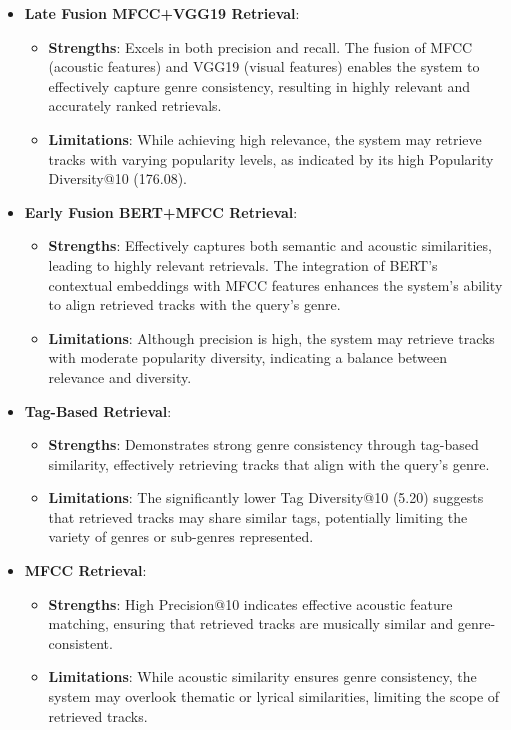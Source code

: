 \documentclass[sigconf]{acmart}
\begin{document}
\begin{itemize}
    \item \textbf{Late Fusion MFCC+VGG19 Retrieval}:
    \begin{itemize}
        \item \textbf{Strengths}: Excels in both precision and recall. The fusion of MFCC (acoustic features) and VGG19 (visual features) enables the system to effectively capture genre consistency, resulting in highly relevant and accurately ranked retrievals.
        \item \textbf{Limitations}: While achieving high relevance, the system may retrieve tracks with varying popularity levels, as indicated by its high Popularity Diversity@10 (176.08).
    \end{itemize}
    
    \item \textbf{Early Fusion BERT+MFCC Retrieval}:
    \begin{itemize}
        \item \textbf{Strengths}: Effectively captures both semantic and acoustic similarities, leading to highly relevant retrievals. The integration of BERT's contextual embeddings with MFCC features enhances the system's ability to align retrieved tracks with the query's genre.
        \item \textbf{Limitations}: Although precision is high, the system may retrieve tracks with moderate popularity diversity, indicating a balance between relevance and diversity.
    \end{itemize}
    
    \item \textbf{Tag-Based Retrieval}:
    \begin{itemize}
        \item \textbf{Strengths}: Demonstrates strong genre consistency through tag-based similarity, effectively retrieving tracks that align with the query's genre.
        \item \textbf{Limitations}: The significantly lower Tag Diversity@10 (5.20) suggests that retrieved tracks may share similar tags, potentially limiting the variety of genres or sub-genres represented.
    \end{itemize}
    
    \item \textbf{MFCC Retrieval}:
    \begin{itemize}
        \item \textbf{Strengths}: High Precision@10 indicates effective acoustic feature matching, ensuring that retrieved tracks are musically similar and genre-consistent.
        \item \textbf{Limitations}: While acoustic similarity ensures genre consistency, the system may overlook thematic or lyrical similarities, limiting the scope of retrieved tracks.
    \end{itemize}
    

\end{itemize}
\end{document}
